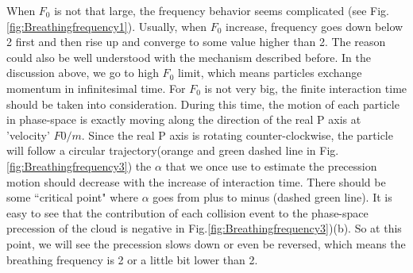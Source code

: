 \documentclass[aps,preprintnumbers,onecolumn,amsmath,amssymb,floatfix,pra]{revtex4-1}
\begin{document}

When $F_0$ is not that large, the frequency behavior seems complicated (see Fig.\ref{fig:Breathingfrequency1}). Usually, when $F_0$ increase, frequency goes down below 2 first and then rise up and converge to some value higher than 2. The reason could also be well understood with the mechanism described before. In the discussion above, we go to high $F_0$ limit, which means particles exchange momentum in infinitesimal time. For $F_0$ is not very big, the finite interaction time should be taken into consideration. During this time, the motion of each particle in phase-space is exactly moving along the direction of the real P axis at 'velocity' $F0/m$. Since the real P axis is rotating counter-clockwise, the particle will follow a circular trajectory(orange and green dashed line in Fig.\ref{fig:Breathingfrequency3}) the $\alpha$ that we once use to estimate the precession motion should decrease with the increase of interaction time. There should be some ``critical point" where $\alpha$ goes from plus to minus (dashed green line). It is easy to see that the contribution of each collision event to the phase-space precession of the cloud is negative in Fig.\ref{fig:Breathingfrequency3})(b). So at this point, we will see the precession  slows down or even be reversed, which means the breathing frequency is 2 or a little bit lower than 2. 
\end{document}
